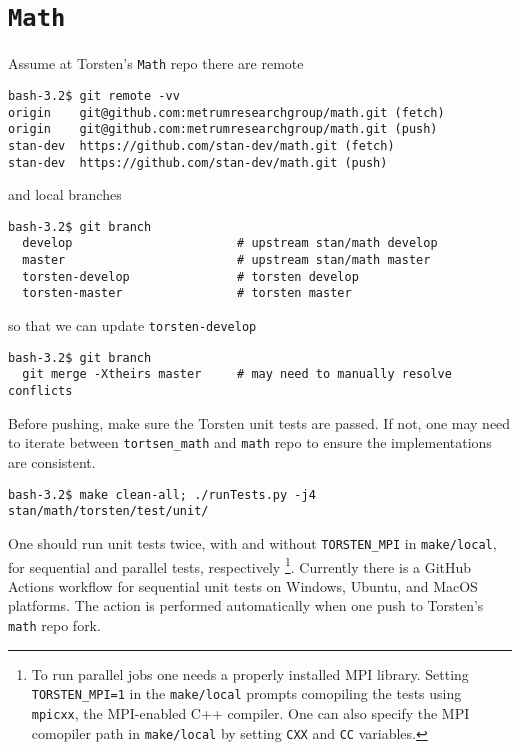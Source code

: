\documentclass[12pt, reqno, oneside]{amsbook}
\numberwithin{equation}{chapter}
\numberwithin{figure}{chapter}
\numberwithin{table}{chapter}
\theoremstyle{remark}
\begin{document}
\section{\texttt{Math}}
\label{sec:org6ba7316}
Assume at Torsten's \texttt{Math} repo there are remote
\begin{verbatim}
bash-3.2$ git remote -vv
origin    git@github.com:metrumresearchgroup/math.git (fetch)
origin    git@github.com:metrumresearchgroup/math.git (push)
stan-dev  https://github.com/stan-dev/math.git (fetch)
stan-dev  https://github.com/stan-dev/math.git (push)
\end{verbatim}
and local branches
\begin{verbatim}
bash-3.2$ git branch
  develop                       # upstream stan/math develop
  master                        # upstream stan/math master
  torsten-develop               # torsten develop
  torsten-master                # torsten master
\end{verbatim}
so that we can update \texttt{torsten-develop}
\begin{verbatim}
bash-3.2$ git branch
  git merge -Xtheirs master     # may need to manually resolve conflicts
\end{verbatim}
Before pushing, make sure the Torsten unit tests are passed. If not,
one may need to iterate between \texttt{tortsen\_math} and \texttt{math} repo to
ensure the implementations are consistent.
\begin{verbatim}
bash-3.2$ make clean-all; ./runTests.py -j4 stan/math/torsten/test/unit/
\end{verbatim}
One should run unit tests twice, with and without \texttt{TORSTEN\_MPI} in
\texttt{make/local}, for sequential and parallel tests, respectively \footnote{To run parallel jobs one needs a properly installed MPI
library. Setting \texttt{TORSTEN\_MPI=1} in the \texttt{make/local} prompts
comopiling the tests using \texttt{mpicxx}, the MPI-enabled C++ compiler. One
can also specify the MPI comopiler path in \texttt{make/local} by setting
\texttt{CXX} and \texttt{CC} variables.}.
Currently there is a GitHub Actions workflow for sequential unit tests
on Windows, Ubuntu, and MacOS platforms. The action is performed
automatically when one push to Torsten's \texttt{math} repo fork.
\end{document}
